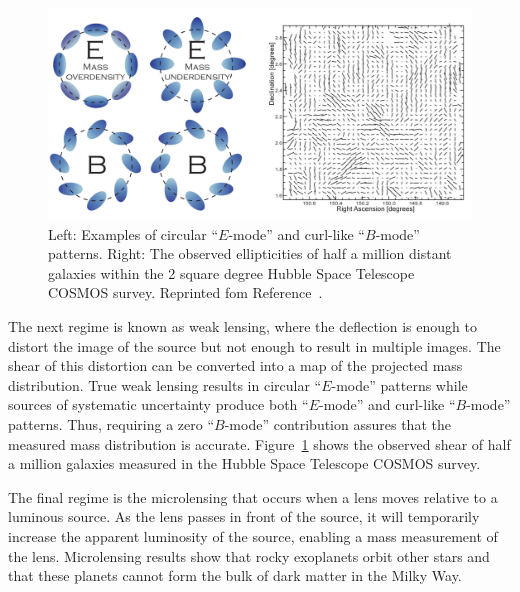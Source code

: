 \begin{figure}[htbp]
  \centering
  \includegraphics[width=\textwidth]{DarkMatter/Figures/weak_lensing.png}
  \caption{
    Left: Examples of circular ``$E$-mode'' and curl-like ``$B$-mode'' patterns.
    Right: The observed ellipticities of half a million distant galaxies within the 2 square degree Hubble Space Telescope COSMOS survey.
    Reprinted fom Reference~\cite{Massey2010}. 
  }
  \label{fig:weak_lensing}
\end{figure}

The next regime is known as weak lensing, where the deflection is enough to distort the image of the source but not enough to result in multiple images.
The shear of this distortion can be converted into a map of the projected mass distribution.
True weak lensing results in circular ``$E$-mode'' patterns while sources of systematic uncertainty produce both ``$E$-mode'' and curl-like ``$B$-mode'' patterns.
Thus, requiring a zero ``$B$-mode'' contribution assures that the measured mass distribution is accurate.
Figure~\ref{fig:weak_lensing} shows the observed shear of half a million galaxies measured in the Hubble Space Telescope COSMOS survey.

The final regime is the microlensing that occurs when a lens moves relative to a luminous source.
As the lens passes in front of the source, it will temporarily increase the apparent luminosity of the source, enabling a mass measurement of the lens.
Microlensing results show that rocky exoplanets orbit other stars and that these planets cannot form the bulk of dark matter in the Milky Way.

